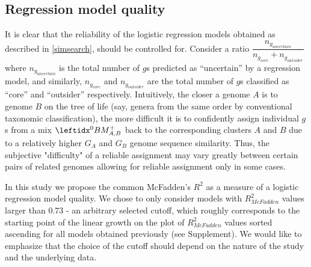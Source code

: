 \subsection{Regression model quality}
\label{regmodqual}
It is clear that the reliability of the logistic regression models obtained as
described in \ref{simsearch}, should be controlled for. Consider a ratio
$\dfrac{n_{g_{uncertain}}}{n_{g_{core}}+n_{g_{outsider}}}$ where
$n_{g_{uncertain}}$ is the total number of $g$s predicted as ``uncertain'' by a
regression model, and similarly, $n_{g_{core}}$ and $n_{g_{outsider}}$ are the
total number of $g$s classified as ``core'' and ``outsider'' respectively.
Intuitively, the closer a genome $A$ is to genome $B$ on the tree of life (say,
genera from the same order by conventional taxonomic classification), the more
difficult it is to confidently assign individual $g$s from a mix $\bmzpab$ back
to the corresponding clusters $A$ and $B$ due to a relatively higher
$G_A$ and $G_B$ genome sequence similarity. Thus, the subjective "difficulty"
of a reliable assignment may vary greatly between certain pairs of related
genomes allowing for reliable assignment only in some cases.

In this study we propose the common McFadden's $R^2$ \cite{McFadden1974} as a
measure of a logistic regression model quality. We chose to only consider
models with $R_{McFadden}^2$ values larger than 0.73 - an arbitrary selected
cutoff, which roughly corresponds to the starting point of the linear growth on
the plot of $R_{McFadden}^2$ values sorted ascending for all models obtained
previously (see Supplement). We would like to emphasize that the choice of the
cutoff should depend on the nature of the study and the underlying data.
